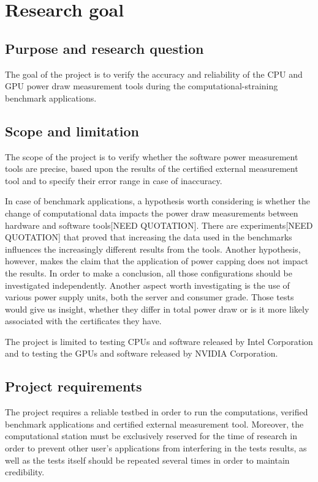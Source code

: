 \chapter{Research goal}

\section{Purpose and research question}

The goal of the project is to verify the accuracy and
reliability of the CPU and GPU power draw measurement
tools during the computational-straining benchmark applications.

\section{Scope and limitation}

The scope of the project is to verify whether the software
power measurement tools are precise, based upon the results
of the certified external measurement tool and to specify
their error range in case of inaccuracy.

In case of benchmark applications, a hypothesis worth
considering is whether the change of computational data
impacts the power draw measurements between hardware and
software tools[NEED QUOTATION]. There are
experiments[NEED QUOTATION] that proved that increasing
the data used in the benchmarks influences the increasingly
different results from the tools. Another hypothesis, however,
makes the claim that the application of power capping does
not impact the results. In order to make a conclusion, all
those configurations should be investigated independently.
Another aspect worth investigating is the use of various
power supply units, both the server and consumer grade. Those
tests would give us insight, whether they differ in total
power draw or is it more likely associated with the certificates
they have.

The project is limited to testing CPUs and software released
by Intel Corporation and to testing the GPUs and software
released by NVIDIA Corporation. 

\section{Project requirements}

The project requires a reliable testbed in order to run the
computations, verified benchmark applications and certified
external measurement tool. Moreover, the computational station
must be exclusively reserved for the time of research in order
to prevent other user's applications from interfering in the
tests results, as well as the tests itself should be repeated
several times in order to maintain credibility.

